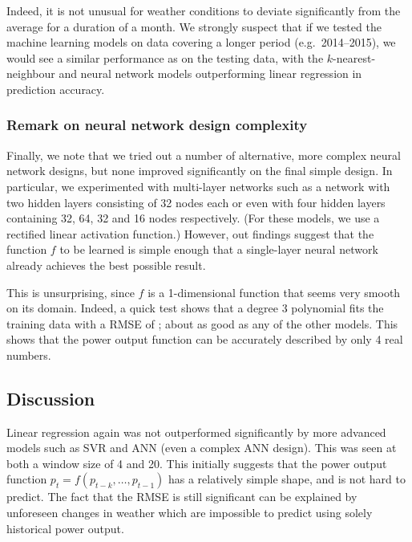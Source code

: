 \documentclass[11pt]{article}
\begin{document}
Indeed, it is not unusual for weather conditions to deviate significantly from the average for a duration of a month.
We strongly suspect that if we tested the machine learning models on data covering a longer period (e.g.\ 2014--2015), we would see a similar performance as on the testing data, with the $k$-nearest-neighbour and neural network models outperforming linear regression in prediction accuracy.


\subsubsection*{Remark on neural network design complexity}

Finally, we note that we tried out a number of alternative, more complex neural network designs, but none improved significantly on the final simple design.
In particular, we experimented with multi-layer networks such as a network with two hidden layers consisting of 32 nodes each or even with four hidden layers containing 32, 64, 32 and 16 nodes respectively.
(For these models, we use a rectified linear activation function.)
However, out findings suggest that the function $f$ to be learned is simple enough that a single-layer neural network already achieves the best possible result.

This is unsurprising, since $f$ is a 1-dimensional function that seems very smooth on its domain.
Indeed, a quick test shows that a degree 3 polynomial fits the training data with a RMSE of ; about as good as any of the other models.
This shows that the power output function can be accurately described by only 4 real numbers.


\clearpage




\subsection*{Discussion}

Linear regression again was not outperformed significantly by more advanced models such as SVR and ANN (even a complex ANN design).
This was seen at both a window size of 4 and 20.
This initially suggests that the power output function $p_t = f(p_{t-k}, \dots, p_{t-1})$ has a relatively simple shape, and is not hard to predict.
The fact that the RMSE is still significant can be explained by unforeseen changes in weather which are impossible to predict using solely historical power output.
\end{document}
